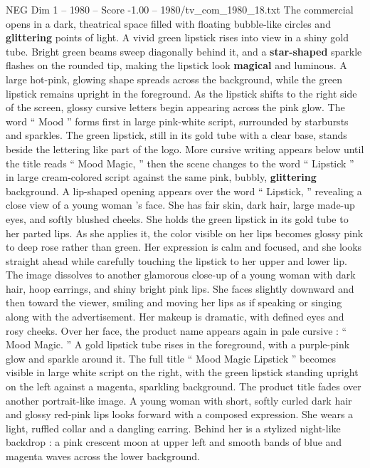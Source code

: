\begin{textsample}{NEG Dim 1 – 1980 – Score -1.00 – 1980/tv\_com\_1980\_18.txt}  \label{ex:f1_neg_050}
The commercial opens in a dark, theatrical space filled with floating bubble-like circles and \textbf{glittering} points of light.
A vivid green lipstick rises into view in a shiny gold tube.
Bright green beams sweep diagonally behind it, and a \textbf{star-shaped} sparkle flashes on the rounded tip, making the lipstick look \textbf{magical} and luminous.
A large hot-pink, glowing shape spreads across the background, while the green lipstick remains upright in the foreground.
As the lipstick shifts to the right side of the screen, glossy cursive letters begin appearing across the pink glow.
The word “ Mood ” forms first in large pink-white script, surrounded by starbursts and sparkles.
The green lipstick, still in its gold tube with a clear base, stands beside the lettering like part of the logo.
More cursive writing appears below until the title reads “ Mood Magic, ” then the scene changes to the word “ Lipstick ” in large cream-colored script against the same pink, bubbly, \textbf{glittering} background.
A lip-shaped opening appears over the word “ Lipstick, ” revealing a close view of a young woman ’s face.
She has fair skin, dark hair, large made-up eyes, and softly blushed cheeks.
She holds the green lipstick in its gold tube to her parted lips.
As she applies it, the color visible on her lips becomes glossy pink to deep rose rather than green.
Her expression is calm and focused, and she looks straight ahead while carefully touching the lipstick to her upper and lower lip.
The image dissolves to another glamorous close-up of a young woman with dark hair, hoop earrings, and shiny bright pink lips.
She faces slightly downward and then toward the viewer, smiling and moving her lips as if speaking or singing along with the advertisement.
Her makeup is dramatic, with defined eyes and rosy cheeks.
Over her face, the product name appears again in pale cursive : “ Mood Magic. ” A gold lipstick tube rises in the foreground, with a purple-pink glow and sparkle around it.
The full title “ Mood Magic Lipstick ” becomes visible in large white script on the right, with the green lipstick standing upright on the left against a magenta, sparkling background.
The product title fades over another portrait-like image.
A young woman with short, softly curled dark hair and glossy red-pink lips looks forward with a composed expression.
She wears a light, ruffled collar and a dangling earring.
Behind her is a stylized night-like backdrop : a pink crescent moon at upper left and smooth bands of blue and magenta waves across the lower background.

\end{textsample}
